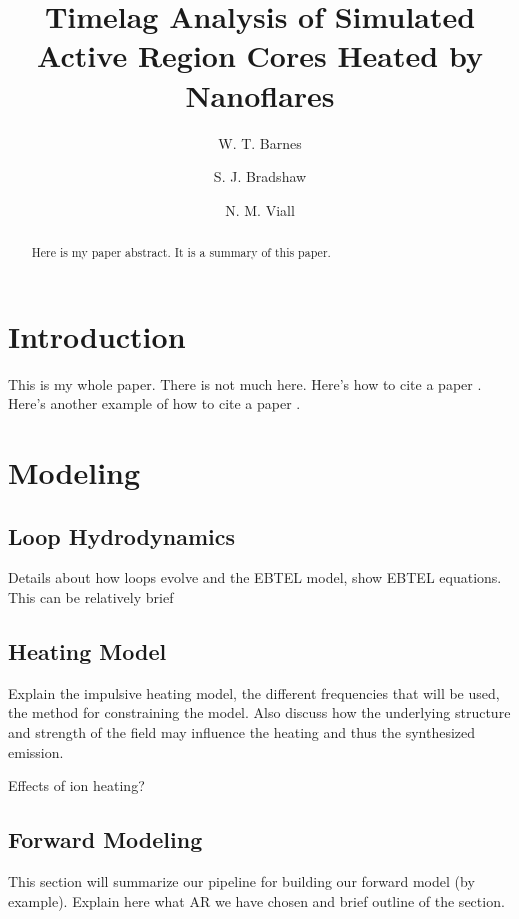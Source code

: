 \documentclass[modern,linenumbers]{aastex62}
\begin{document}
\title{Timelag Analysis of Simulated Active Region Cores Heated by Nanoflares}

\author[0000-0001-9642-6089]{W. T. Barnes}
\author{S. J. Bradshaw}
\author{N. M. Viall}

\begin{abstract}
Here is my paper abstract. It is a summary of this paper.
\end{abstract}



\section{Introduction}\label{introduction}

This is my whole paper. There is not much here. Here's how to cite a
paper \citet{viall_evidence_2012}. Here's another example of how to cite
a paper \citep{warren_constraints_2011}.

\section{Modeling}
\label{modeling}

\subsection{Loop Hydrodynamics}
\label{loops}
Details about how loops evolve and the EBTEL model, show EBTEL equations. This can be relatively brief

\subsection{Heating Model}
\label{heating}
Explain the impulsive heating model, the different frequencies that will be used, the method for constraining the model. Also discuss how the underlying structure and strength of the field may influence the heating and thus the synthesized emission.

Effects of ion heating?

\subsection{Forward Modeling}
\label{forward}
This section will summarize our pipeline for building our forward model (by example). Explain here what AR we have chosen and brief outline of the section.
\end{document}
